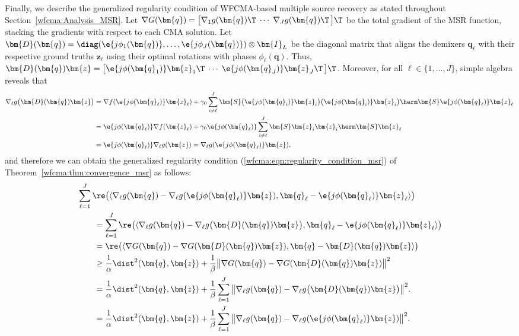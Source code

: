 Finally, we describe the generalized regularity condition of WFCMA-based multiple source recovery as stated throughout Section~\ref{wfcma:Analysis_MSR}. Let $\nabla G (\bm{q}) = \big[\nabla_1 g(\bm{q})\T\;\cdots\; \nabla_J g(\bm{q})\T\,\big]\T$ be the total gradient of the MSR function, stacking the gradients with respect to each CMA solution. 
Let $\bm{D}(\bm{q})= \diag(\e{j\phi_1(\bm{q})},\ldots,\e{j\phi_J(\bm{q})})\otimes\bm{I}_L$ be the diagonal matrix that aligns the demixers $\bm{q}_{\ell}$ with their respective ground truths $\bm{z}_{\ell}$ using their optimal rotations with phases $\phi_{\ell}(\bm{q})$. Thus, $\bm{D}(\bm{q})\bm{z}=\big[\e{j\phi(\bm{q}_{1})}\bm{z}_1\T\;\cdots\; \e{j\phi(\bm{q}_{J})}\bm{z}_J\T\,\big]\T $. Moreover, for all $\ell\in\{1,\ldots,J\}$, simple algebra reveals that
\begin{align}
	\nabla_{\ell} g\big(\bm{D}(\bm{q})\bm{z}\big)
	&= \nabla f(\e{j\phi(\bm{q}_{\ell})}\bm{z}_{\ell}) + \gamma_0 \sum_{i\neq {\ell}}^J\bm{S}\big(\e{j\phi(\bm{q}_{i})}\bm{z}_{i}\big)\big(\e{j\phi(\bm{q}_{i})}\bm{z}_{i}\big)\herm\bm{S}\e{j\phi(\bm{q}_{\ell})}\bm{z}_{\ell} \nonumber\\
	&= \e{j\phi(\bm{q}_{\ell})}\nabla f(\bm{z}_{\ell}) + \gamma_0 \e{j\phi(\bm{q}_{\ell})} \sum_{i\neq {\ell}}^J\bm{S}\bm{z}_{i}\bm{z}_{i}\herm\bm{S}\bm{z}_{\ell} \nonumber\\
	&= \e{j\phi(\bm{q}_{\ell})}\nabla_{\ell}g(\bm{z})=\nabla_{\ell} g(\e{j\phi(\bm{q}_{\ell})}\bm{z}),\nonumber
\end{align}
and therefore we can obtain the generalized regularity condition (\ref{wfcma:eqn:regularity_condition_msr}) of Theorem~\ref{wfcma:thm:convergence_msr} as follows:
\begin{align}
	&\sum_{{\ell}=1}^J\re\big(\langle \nabla_{\ell} g(\bm{q})-\nabla_{\ell} g(\e{j\phi(\bm{q}_{\ell})}\bm{z}),\bm{q}_{\ell}-\e{j\phi(\bm{q}_{\ell})}\bm{z}_{\ell} \rangle\big)\nonumber\\
	&\qquad=\sum_{{\ell}=1}^J\re\big(\langle \nabla_{\ell} g(\bm{q})-\nabla_{\ell} g\big(\bm{D}(\bm{q})\bm{z}\big),\bm{q}_{\ell}-\e{j\phi(\bm{q}_{\ell})}\bm{z}_{\ell} \rangle\big)\nonumber\\
	&\qquad=\re\big(\langle \nabla G(\bm{q})-\nabla G(\bm{D}(\bm{q})\bm{z}),\bm{q}-\bm{D}(\bm{q})\bm{z} \rangle\big)\nonumber\\
	&\qquad\geq \frac{1}{\alpha} \dist^2(\bm{q},\bm{z})+\frac{1}{\beta}\big\|\nabla G(\bm{q})-\nabla G(\bm{D}(\bm{q})\bm{z})\big\|^2\nonumber\\
	&\qquad=\frac{1}{\alpha}\dist^2(\bm{q},\bm{z})+\frac{1}{\beta}\sum_{{\ell}=1}^J\big\|\nabla_{\ell} g(\bm{q})-\nabla_{\ell} g\big(\bm{D}(\bm{q})\bm{z}\big)\big\|^2.\nonumber\\
	&\qquad=\frac{1}{\alpha}\dist^2(\bm{q},\bm{z})+\frac{1}{\beta}\sum_{{\ell}=1}^J\big\|\nabla_{\ell} g(\bm{q})-\nabla_{\ell} g(\e{j\phi(\bm{q}_{\ell})}\bm{z})\big\|^2.\nonumber
\end{align}

